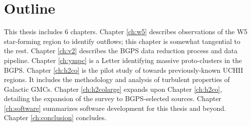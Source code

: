


\section{Outline}
This thesis includes 6 chapters.
Chapter \ref{ch:w5} describes observations of the W5 star-forming region to identify outflows;
this chapter is somewhat tangential to the rest.
Chapter \ref{ch:v2} describes the BGPS data reduction process and data pipeline.
Chapter \ref{ch:ympc} is a Letter identifying massive proto-clusters in the BGPS.
Chapter \ref{ch:h2co} is the pilot study of \formaldehyde towards previously-known UCHII regions.
It includes the methodology and analysis of turbulent properties of Galactic GMCs.
Chapter \ref{ch:h2colarge} expands upon Chapter \ref{ch:h2co}, detailing the expansion of the \formaldehyde survey
to BGPS-selected sources.
Chapter \ref{ch:software} summarizes software development for this thesis and beyond.
Chapter \ref{ch:conclusion} concludes.



